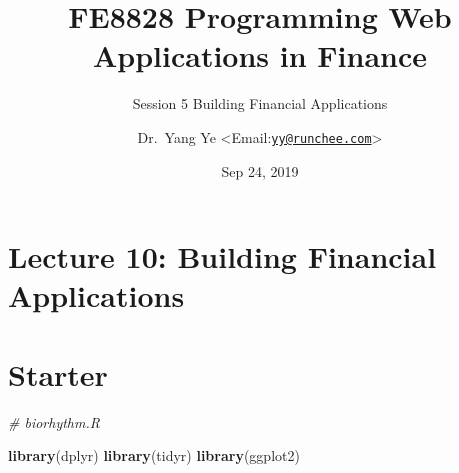 \documentclass[]{article}
\title{FE8828 Programming Web Applications in Finance}
\subtitle{Session 5 Building Financial Applications}
\author{Dr.~Yang Ye
\textless Email:\href{mailto:yy@runchee.com}{\nolinkurl{yy@runchee.com}}\textgreater{}}
\date{Sep 24, 2019}
\newenvironment{Shaded}{\begin{snugshade}}{\end{snugshade}}
\newcommand{\CommentTok}[1]{\textcolor[rgb]{0.56,0.35,0.01}{\textit{#1}}}
\newcommand{\KeywordTok}[1]{\textcolor[rgb]{0.13,0.29,0.53}{\textbf{#1}}}
\newcommand{\NormalTok}[1]{#1}
\begin{document}
\maketitle

\hypertarget{lecture-10-building-financial-applications}{%
\section{Lecture 10: Building Financial
Applications}\label{lecture-10-building-financial-applications}}

\hypertarget{starter}{%
\section{Starter}\label{starter}}

\begin{Shaded}
\begin{Highlighting}[]
\CommentTok{# biorhythm.R}

\KeywordTok{library}\NormalTok{(dplyr)}
\KeywordTok{library}\NormalTok{(tidyr)}
\KeywordTok{library}\NormalTok{(ggplot2)}


\end{Highlighting}
\end{Shaded}
\end{document}
